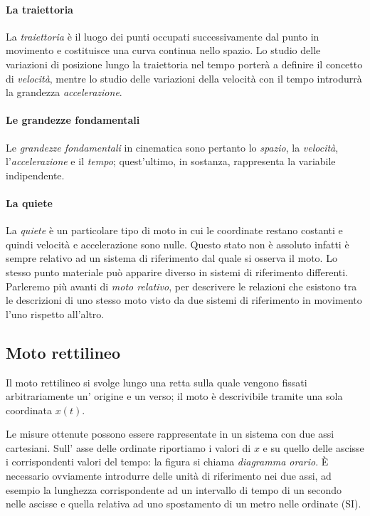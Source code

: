 \documentclass[class=book, crop=false, oneside, 12pt]{standalone}
\begin{document}
\paragraph{La traiettoria}
La \emph{traiettoria} è il luogo dei punti occupati successivamente dal punto
in movimento e costituisce una curva continua nello spazio. Lo studio
delle variazioni di posizione lungo la traiettoria nel tempo porterà a
definire il concetto di \emph{velocità}, mentre lo studio delle
variazioni della velocità con il tempo introdurrà la grandezza
\emph{accelerazione}.

\paragraph{Le grandezze fondamentali}
Le \emph{grandezze fondamentali} in cinematica sono pertanto lo
\emph{spazio}, la \emph{velocità}, l'\emph{accelerazione} e il
\emph{tempo}; quest'ultimo, in sostanza, rappresenta la variabile
indipendente.

\paragraph{La quiete}
La \emph{quiete} è un particolare tipo di moto in cui le coordinate
restano costanti e quindi velocità e accelerazione sono nulle. Questo
stato non è assoluto infatti è sempre relativo ad un sistema di
riferimento dal quale si osserva il moto. Lo stesso punto materiale può
apparire diverso in sistemi di riferimento differenti. Parleremo più
avanti di \emph{moto relativo}, per descrivere le relazioni che esistono
tra le descrizioni di uno stesso moto visto da due sistemi di
riferimento in movimento l'uno rispetto all'altro.


\subsection{Moto rettilineo}
Il moto rettilineo si svolge lungo una retta sulla quale vengono fissati
arbitrariamente un' origine e un verso; il moto è descrivibile tramite
una sola coordinata \(x(t)\).

Le misure ottenute possono essere rappresentate in un sistema con due
assi cartesiani. Sull' asse delle ordinate riportiamo i valori di \(x\)
e su quello delle ascisse i corrispondenti valori del tempo: la figura
si chiama \emph{diagramma orario}. È necessario ovviamente introdurre
delle unità di riferimento nei due assi, ad esempio la lunghezza
corrispondente ad un intervallo di tempo di un secondo nelle ascisse e
quella relativa ad uno spostamento di un metro nelle ordinate (SI).
\end{document}
